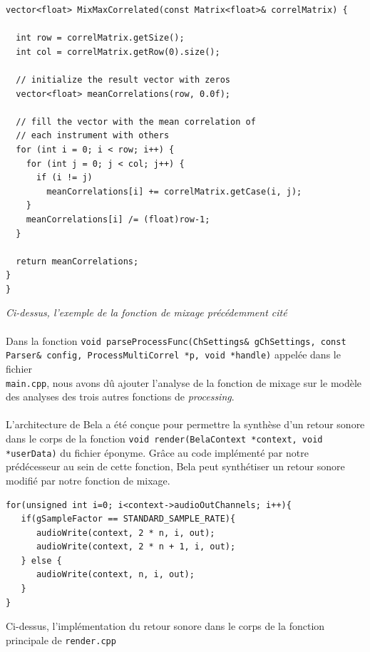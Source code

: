 \begin{lstlisting}
vector<float> MixMaxCorrelated(const Matrix<float>& correlMatrix) {

  int row = correlMatrix.getSize();
  int col = correlMatrix.getRow(0).size();

  // initialize the result vector with zeros
  vector<float> meanCorrelations(row, 0.0f);

  // fill the vector with the mean correlation of
  // each instrument with others
  for (int i = 0; i < row; i++) {
    for (int j = 0; j < col; j++) {
      if (i != j)
        meanCorrelations[i] += correlMatrix.getCase(i, j);
    }
    meanCorrelations[i] /= (float)row-1;
  }

  return meanCorrelations;
}
}
\end{lstlisting}

\begin{center}
 \textit{Ci-dessus, l'exemple de la fonction de mixage précédemment cité}
\end{center}

\paragraph{}
Dans la fonction
\verb!void parseProcessFunc(ChSettings& gChSettings, const!
\\ \verb!Parser& config, ProcessMultiCorrel *p, void *handle)!
appelée dans le fichier \\ \verb!main.cpp!, nous avons dû ajouter
l'analyse de la fonction de mixage sur le modèle des analyses des
trois autres fonctions de \textit{processing}.

\paragraph{}
L'architecture de Bela a été conçue pour permettre la synthèse d'un
retour sonore dans le corps de la fonction
\verb!void render(BelaContext *context, void *userData)! du fichier
éponyme. Grâce au code implémenté par notre prédécesseur au sein de
cette fonction, Bela peut synthétiser un retour sonore modifié par
notre fonction de mixage.

\begin{lstlisting}
for(unsigned int i=0; i<context->audioOutChannels; i++){
   if(gSampleFactor == STANDARD_SAMPLE_RATE){
      audioWrite(context, 2 * n, i, out);
      audioWrite(context, 2 * n + 1, i, out);
   } else {
      audioWrite(context, n, i, out);
   }
}
\end{lstlisting} \begin{center} Ci-dessus, l'implémentation du retour sonore
dans le corps de la fonction principale de \verb!render.cpp! \end{center}

